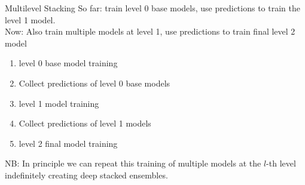 \documentclass[11pt,compress,t,notes=noshow, aspectratio=169, xcolor=table]{beamer}
\begin{document}
\begin{vbframe}{Multilevel Stacking}
\vfill
So far: train level 0 base models, use predictions to train the level 1 model.\\
Now: Also train multiple models at level 1, use predictions to train final level 2 model 
\vfill
\begin{enumerate}
    \item level 0 base model training
    \item Collect predictions of level 0 base models
    \item level 1 model training 
    \item Collect predictions of level 1 models
    \item level 2 final model training
\end{enumerate}
\vfill
NB: In principle we can repeat this training of multiple models at the $l$-th level indefinitely creating deep stacked ensembles.
\vfill
\end{vbframe}

\end{document}
